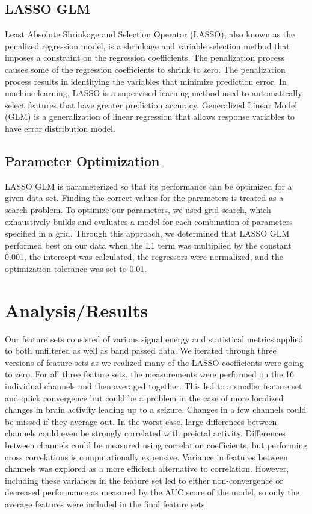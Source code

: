 \documentclass[10pt, conference, compsocconf]{IEEEtran}
\begin{document}
\subsection{LASSO GLM}
Least Absolute Shrinkage and Selection Operator (LASSO), also known as the
penalized regression model, is a shrinkage and variable selection method that
imposes a constraint on the regression coefficients. The penalization process
causes some of the regression coefficients to shrink to zero. The penalization
process results in identifying the variables that minimize prediction error. In
machine learning, LASSO is a supervised learning method used to automatically
select features that have greater prediction accuracy. Generalized Linear Model
(GLM) is a generalization of linear regression that allows response variables to
have error distribution model.

\subsection{Parameter Optimization}
LASSO GLM is parameterized so that its performance can be optimized for a given
data set.  Finding the correct values for the parameters is treated as a search
problem.  To optimize our parameters, we used grid search, which exhaustively
builds and evaluates a model for each combination of parameters specified in a
grid.  Through this approach, we determined that LASSO GLM performed best on our
data when the L1 term was multiplied by the constant 0.001, the intercept was
calculated, the regressors were normalized,  and the optimization tolerance was
set to 0.01.

\section{Analysis/Results}
Our feature sets consisted of various signal energy and statistical metrics
applied to both unfiltered as well as band passed data. We iterated through
three versions of feature sets as we realized many of the LASSO coefficients
were going to zero. For all three feature sets, the measurements were performed
on the 16 individual channels and then averaged together. This led to a smaller
feature set and quick convergence but could be a problem in the case of more
localized changes in brain activity leading up to a seizure. Changes in a few
channels could be missed if they average out. In the worst case, large
differences between channels could even be strongly correlated with preictal
activity. Differences between channels could be measured using correlation
coefficients, but performing cross correlations is computationally expensive.
Variance in features between channels was explored as a more efficient
alternative to correlation. However, including these variances in the feature
set led to either non-convergence or decreased performance as measured by the
AUC score of the model, so only the average features were included in the final
feature sets.
\end{document}
